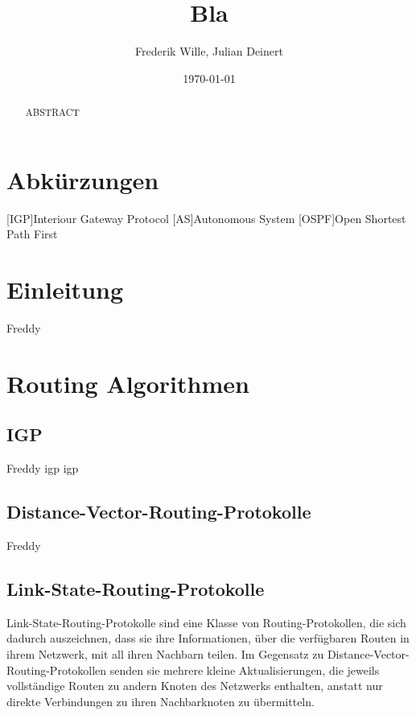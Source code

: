 \documentclass[1pt,a4paper,final]{article}
\title{\LARGE \bf
Bla
}
\author{Frederik Wille, Julian Deinert}
\date{\today}
\begin{document}

\maketitle
\thispagestyle{empty}
\newpage
\thispagestyle{empty}
\tableofcontents
\newpage
\setcounter{page}{1}

\section*{Abkürzungen}
\begin{acronym}
		[IGP]{Interiour Gateway Protocol}
		[AS]{Autonomous System}
		{Open Shortest Path First}
\end{acronym}
\newpage
\begin{abstract}
ABSTRACT

\end{abstract}

\section{Einleitung}
Freddy
\section{Routing Algorithmen}
\subsection{IGP}
Freddy
\ac{igp} \ac{igp}
\subsection{Distance-Vector-Routing-Protokolle}
Freddy
\subsection{Link-State-Routing-Protokolle}
Link-State-Routing-Protokolle sind eine Klasse von Routing-Protokollen, die sich dadurch auszeichnen, dass sie ihre Informationen, über die verfügbaren Routen in ihrem Netzwerk, mit all ihren Nachbarn teilen. Im Gegensatz zu Distance-Vector-Routing-Protokollen senden sie mehrere kleine Aktualisierungen, die jeweils vollständige Routen zu andern Knoten des Netzwerks enthalten, anstatt nur direkte Verbindungen zu ihren Nachbarknoten zu übermitteln.
\end{document}
